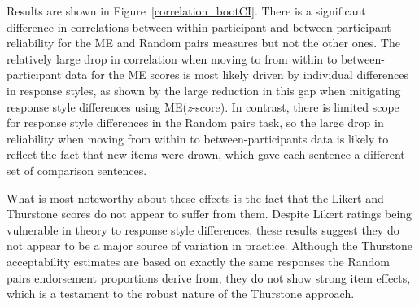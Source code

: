\documentclass[doc]{apa6}
\newcommand{\rndchoice}{{\sc Random pairs}}
\newcommand{\MEz}{{\sc ME{({\it z}-score)}}}
\newcommand{\ME}{{\sc ME}}%
\newcommand{\thurstone}{{\sc Thurstone}}
\newcommand{\likert}{{\sc Likert}}
\begin{document}
Results are shown in Figure~\ref{correlation_bootCI}. There is a significant difference in correlations between within-participant and between-participant reliability for the \ME{} and \rndchoice{} measures but not the other ones.
The relatively large drop in correlation when moving to from within to between-participant data for the \ME{} scores is most likely driven by individual differences in response styles, as shown by the large reduction in this gap when mitigating response style differences using \MEz.
In contrast, there is limited scope for response style differences in the \rndchoice{} task, so the large drop in reliability when moving from within to between-participants data is likely to reflect the fact that new items were drawn, which gave each sentence a different set of comparison sentences.

What is most noteworthy about these effects is the fact that the \likert{} and \thurstone{} scores do not appear to suffer from them. Despite \likert{} ratings being vulnerable in theory to response style differences, these results suggest they do not appear to be a major source of variation in practice. Although the \thurstone{} acceptability estimates are based on exactly the same responses the \rndchoice{} endorsement proportions derive from, they do not show strong item effects, which is a testament to the robust nature of the \thurstone{} approach.
\end{document}
